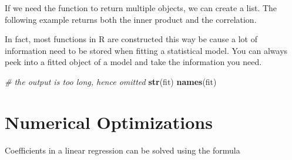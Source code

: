 \documentclass[
]{article}
\newenvironment{Shaded}{\begin{snugshade}}{\end{snugshade}}
\newcommand{\CommentTok}[1]{\textcolor[rgb]{0.56,0.35,0.01}{\textit{#1}}}
\newcommand{\ControlFlowTok}[1]{\textcolor[rgb]{0.13,0.29,0.53}{\textbf{#1}}}
\newcommand{\KeywordTok}[1]{\textcolor[rgb]{0.13,0.29,0.53}{\textbf{#1}}}
\newcommand{\NormalTok}[1]{#1}
\newcommand{\OperatorTok}[1]{\textcolor[rgb]{0.81,0.36,0.00}{\textbf{#1}}}
\newcommand{\StringTok}[1]{\textcolor[rgb]{0.31,0.60,0.02}{#1}}
\begin{document}
If we need the function to return multiple objects, we can create a
list. The following example returns both the inner product and the
correlation.

\begin{Shaded}
\end{Shaded}

In fact, most functions in R are constructed this way be cause a lot of
information need to be stored when fitting a statistical model. You can
always peek into a fitted object of a model and take the information you
need.

\begin{Shaded}
\begin{Highlighting}[]
    \CommentTok{# the output is too long, hence omitted}
    \KeywordTok{str}\NormalTok{(fit)}
    \KeywordTok{names}\NormalTok{(fit)}
\end{Highlighting}
\end{Shaded}

\begin{Shaded}
\end{Shaded}

\hypertarget{numerical-optimizations}{%
\section{Numerical Optimizations}\label{numerical-optimizations}}

Coefficients in a linear regression can be solved using the formula
\end{document}
